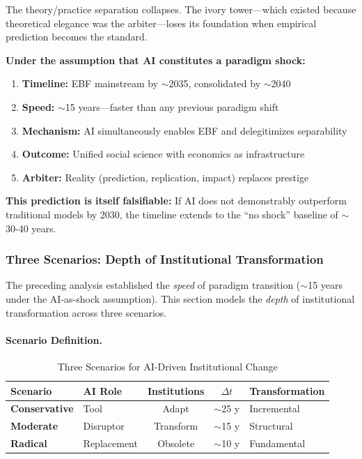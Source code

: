 The theory/practice separation collapses. The ivory tower---which existed because
theoretical elegance was the arbiter---loses its foundation when empirical
prediction becomes the standard.

\begin{tcolorbox}[colback=red!5!white, colframe=red!75!black,
    title=\textbf{The Prediction}]

\textbf{Under the assumption that AI constitutes a paradigm shock:}

\begin{enumerate}[nosep]
    \item \textbf{Timeline:} EBF mainstream by $\sim$2035, consolidated by $\sim$2040
    \item \textbf{Speed:} $\sim$15 years---faster than any previous paradigm shift
    \item \textbf{Mechanism:} AI simultaneously enables EBF and delegitimizes separability
    \item \textbf{Outcome:} Unified social science with economics as infrastructure
    \item \textbf{Arbiter:} Reality (prediction, replication, impact) replaces prestige
\end{enumerate}

\textbf{This prediction is itself falsifiable:} If AI does not demonstrably outperform
traditional models by 2030, the timeline extends to the ``no shock'' baseline
of $\sim$30-40 years.

\end{tcolorbox}


\subsubsection{Three Scenarios: Depth of Institutional Transformation}

The preceding analysis established the \textit{speed} of paradigm transition ($\sim$15 years
under the AI-as-shock assumption). This section models the \textit{depth} of institutional
transformation across three scenarios.

\paragraph{Scenario Definition.}

\begin{table}[htbp]
\centering
\caption{Three Scenarios for AI-Driven Institutional Change}
\label{tab:three-scenarios}
\renewcommand{\arraystretch}{1.3}
\small
\begin{tabular}{@{}llccl@{}}
\toprule
\textbf{Scenario} & \textbf{AI Role} & \textbf{Institutions} & $\Delta t$ & \textbf{Transformation} \\
\midrule
\textbf{Conservative} & Tool & Adapt & $\sim$25 y & Incremental \\
\textbf{Moderate} & Disruptor & Transform & $\sim$15 y & Structural \\
\textbf{Radical} & Replacement & Obsolete & $\sim$10 y & Fundamental \\
\bottomrule
\end{tabular}
\end{table}

